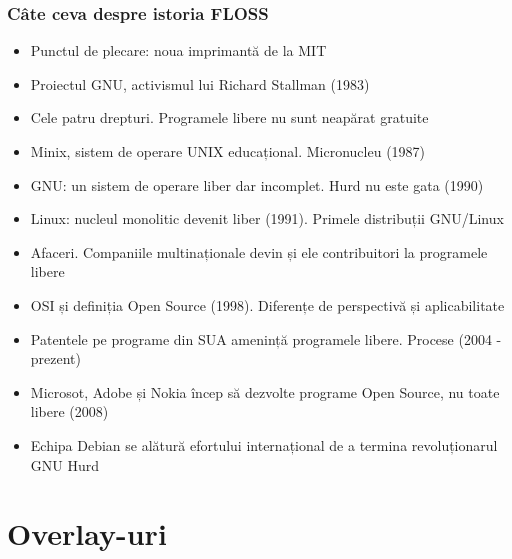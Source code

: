 \documentclass{beamer}
\begin{document}
\begin{frame}[allowframebreaks] %
\frametitle{Câte ceva despre istoria FLOSS}
\begin{itemize}
\item Punctul de plecare: noua imprimantă de la MIT
\item Proiectul GNU, activismul lui Richard Stallman (1983)
\item Cele patru drepturi. Programele libere nu sunt neapărat gratuite
\item Minix, sistem de operare UNIX educațional. Micronucleu (1987)
\item GNU: un sistem de operare liber dar incomplet. Hurd nu este gata (1990)
\item Linux: nucleul monolitic devenit liber (1991). Primele distribuții
GNU/Linux
\item Afaceri. Companiile multinaționale devin și ele contribuitori la
programele libere
\item OSI și definiția Open Source (1998). Diferențe de perspectivă și
aplicabilitate
\item Patentele pe programe din SUA amenință programele libere. Procese (2004
- prezent)
\item Microsot, Adobe și Nokia încep să dezvolte programe Open Source, nu
toate libere (2008)
\item Echipa Debian se alătură efortului internațional de a termina
revoluționarul GNU Hurd
\end{itemize}
\end{frame}

%


%

\section{Overlay-uri}
\frame{\tableofcontents[currentsection]}
\end{document}
